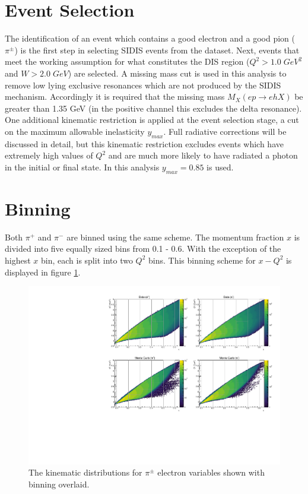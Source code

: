 \section{Event Selection}
The identification of an event which contains a good electron and a good pion ($\pi^{\pm}$) is the first step in selecting SIDIS events from the dataset.  Next, events that meet the working assumption for what constitutes the DIS region ($Q^2 > 1.0 \; GeV^2$ and $W > 2.0 \; GeV$) are selected.  A missing mass cut is used in this analysis to remove low lying exclusive resonances which are not produced by the SIDIS mechanism.  Accordingly it is required that the missing mass $M_X (e p \rightarrow e h X)$ be greater than 1.35 GeV (in the positive channel this excludes the delta resonance).  \\

One additional kinematic restriction is applied at the event selection stage, a cut on the maximum allowable inelasticity $y_{max}$.  Full radiative corrections will be discussed in detail, but this kinematic restriction excludes events which have extremely high values of $Q^2$ and are much more likely to have radiated a photon in the initial or final state.  In this analysis $y_{max} = 0.85$ is used.  

\section{Binning}
Both $\pi^+$ and $\pi^-$ are binned using the same scheme.  The momentum fraction $x$ is divided into five equally sized bins from 0.1 - 0.6.  With the exception of the highest $x$ bin, each is split into two $Q^2$ bins.  This binning scheme for $x-Q^2$ is displayed in figure \ref{fig:kinematics_xq2}.  \\

\begin{figure}
  \centering
  \includegraphics[width=\textwidth]{image/plots/sidis/xq2.pdf}
  \caption[Kinematic distributions and binning for electron variables.]{The kinematic distributions for $\pi^{\pm}$ electron variables shown with binning overlaid.}
  \label{fig:kinematics_xq2}

\end{figure}

